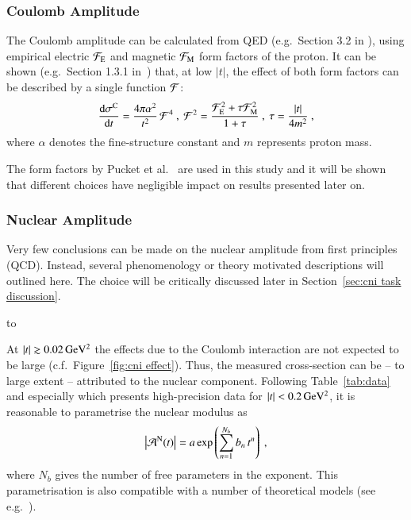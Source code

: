 \subsubsection{Coulomb Amplitude}
\label{sec:cni coulomb}
%
The Coulomb amplitude can be calculated from QED (e.g.~Section 3.2 in \cite{block06}), using empirical electric ${\cal F}_{\rm E}$ and magnetic ${\cal F}_{\rm M}$ form factors of the proton. It can be shown (e.g.~Section 1.3.1 in~\cite{jan_thesis}) that, at low $|t|$, the effect of both form factors can be described by a single function ${\cal F}$:
\begin{equation}
\label{eq:coul cs}
	{\d\sigma^{\rm C}\over \d t} = {4\pi\alpha^2\over t^2}\,{\cal F}^4\ ,\ 
	{\cal F}^2 = {{\cal F}_{\rm E}^2 + \tau {\cal F}_{\rm M}^2\over 1 + \tau}\ ,\ 
	\tau = {|t|\over 4m^2}\ ,
\end{equation}
where $\alpha$ denotes the fine-structure constant and $m$ represents proton mass.

The form factors by Pucket et al.~\cite{puckett10} are used in this study and it will be shown that different choices have negligible impact on results presented later on.


\subsubsection{Nuclear Amplitude}
\label{sec:cni nuclear}

Very few conclusions can be made on the nuclear amplitude from first principles (QCD). Instead, several phenomenology or theory motivated descriptions will outlined here. The choice will be critically discussed later in Section~\ref{sec:cni task discussion}.

\vskip3mm
\hbox to

At $|t| \gtrsim 0.02\,{\rm GeV^2}$ the effects due to the Coulomb interaction are not expected to be large (c.f.~Figure~\ref{fig:cni effect}). Thus, the measured cross-section can be -- to large extent -- attributed to the nuclear component. Following Table~\ref{tab:data} and especially \cite{8tev-90m} which presents high-precision data for $|t| < 0.2\,{\rm GeV^2}$, it is reasonable to parametrise the nuclear modulus as
\begin{equation}
\label{eq:nuc mod}
\left | {\cal A}^{\rm N}(t) \right | = a \exp\left( \sum\limits_{n = 1}^{N_b} b_n\, t^n \right)\ ,
\end{equation}
where $N_b$ gives the number of free parameters in the exponent. This parametrisation is also compatible with a number of theoretical models (see e.g.~\cite{elegent}).

